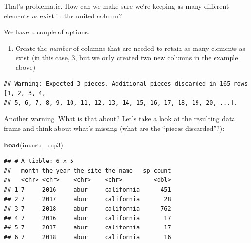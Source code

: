\documentclass[]{book}
\newenvironment{Shaded}{\begin{snugshade}}{\end{snugshade}}
\newcommand{\DataTypeTok}[1]{\textcolor[rgb]{0.13,0.29,0.53}{#1}}
\newcommand{\KeywordTok}[1]{\textcolor[rgb]{0.13,0.29,0.53}{\textbf{#1}}}
\newcommand{\NormalTok}[1]{#1}
\newcommand{\OperatorTok}[1]{\textcolor[rgb]{0.81,0.36,0.00}{\textbf{#1}}}
\newcommand{\StringTok}[1]{\textcolor[rgb]{0.31,0.60,0.02}{#1}}
\providecommand{\tightlist}{%
  \setlength{\itemsep}{0pt}\setlength{\parskip}{0pt}}
\begin{document}
That's problematic. How can we make sure we're keeping as many different elements as exist in the united column?

We have a couple of options:

\begin{enumerate}
\def\labelenumi{\arabic{enumi}.}
\tightlist
\item
  Create the \emph{number} of columns that are needed to retain as many elements as exist (in this case, 3, but we only created two new columns in the example above)
\end{enumerate}

\begin{Shaded}
\end{Shaded}

\begin{verbatim}
## Warning: Expected 3 pieces. Additional pieces discarded in 165 rows [1, 2, 3, 4,
## 5, 6, 7, 8, 9, 10, 11, 12, 13, 14, 15, 16, 17, 18, 19, 20, ...].
\end{verbatim}

Another warning. What is that about? Let's take a look at the resulting data frame and think about what's missing (what are the ``pieces discarded''?):

\begin{Shaded}
\begin{Highlighting}[]
\KeywordTok{head}\NormalTok{(inverts_sep3)}
\end{Highlighting}
\end{Shaded}

\begin{verbatim}
## # A tibble: 6 x 5
##   month the_year the_site the_name   sp_count
##   <chr> <chr>    <chr>    <chr>         <dbl>
## 1 7     2016     abur     california      451
## 2 7     2017     abur     california       28
## 3 7     2018     abur     california      762
## 4 7     2016     abur     california       17
## 5 7     2017     abur     california       17
## 6 7     2018     abur     california       16
\end{verbatim}
\end{document}

